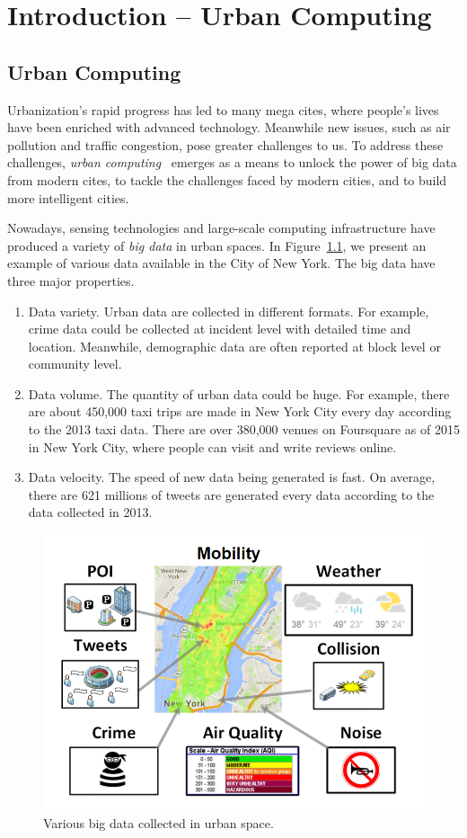 \chapter{Introduction -- Urban Computing} 
\label{chapter1:introduction}



\section{Urban Computing}

Urbanization's rapid progress has led to many mega cites, where people's lives have been enriched with advanced technology. Meanwhile new issues, such as air pollution and traffic congestion, pose greater challenges to us. To address these challenges, \emph{urban computing}~\cite{zheng2014urban} emerges as a means to unlock the power of big data from modern cites, to tackle the challenges faced by modern cities,  and to build more intelligent cities.

Nowadays, sensing technologies and large-scale computing infrastructure have produced a variety of \emph{big data} in urban spaces. In Figure~\ref{fig:intro}, we present an example of various data available in the City of New York. The big data have three major properties. 
\begin{enumerate}
\item Data variety. Urban data are collected in different formats. For example, crime data could be collected at incident level with detailed time and location. Meanwhile, demographic data are often reported at block level or community level.
\item Data volume. The quantity of urban data could be huge. For example, there are about 450,000 taxi trips are made in New York City every day according to the 2013 taxi data. There are over 380,000 venues on Foursquare as of 2015 in New York City, where people can visit and write reviews online.
\item Data velocity. The speed of new data being generated is fast. On average, there are 621 millions of tweets are generated every data according to the data collected in 2013.
\end{enumerate}

\begin{figure}[h]
\centering
\includegraphics[width=0.8\linewidth]{fig/intro-data-v2.png}
\caption{Various big data collected in urban space.}
\label{fig:intro}
\end{figure}

